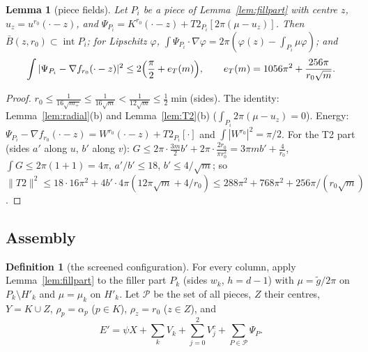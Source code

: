 \documentclass[11pt]{article}
\newtheorem{lemma}[theorem]{Lemma}
\theoremstyle{definition}
\newtheorem{definition}[theorem]{Definition}
\theoremstyle{remark}
\begin{document}
\begin{lemma}[piece fields]\label{lem:piece}
Let $P_i$ be a piece of Lemma~\ref{lem:fillpart} with centre $z$, $u_z=u^{r_0}(\cdot-z)$, and
$\Psi_{P_i}=K^{r_0}(\cdot-z)+T2_{P_i}[2\pi(\mu-u_z)]$. Then $\bar B(z,r_0)\subset\operatorname{int}P_i$; for Lipschitz $\varphi$,
$\int\Psi_{P_i}\cdot\nabla\varphi=2\pi(\varphi(z)-\int_{P_i}\mu\varphi)$; and
\[
\int|\Psi_{P_i}-\nabla f_{r_0}(\cdot-z)|^2\le2\Bigl(\frac\pi2+e_T(m)\Bigr),\qquad e_T(m)=1056\pi^2+\frac{256\pi}{r_0\sqrt m}.
\]
\end{lemma}
\begin{proof}
$r_0\le\frac1{16\sqrt{m_+}}\le\frac1{16\sqrt m}<\frac1{12\sqrt m}\le\frac12\min$(sides). The identity: Lemma~\ref{lem:radial}(b) and Lemma~\ref{lem:T2}(b)
($\int_{P_i}2\pi(\mu-u_z)=0$). Energy: $\Psi_{P_i}-\nabla f_{r_0}(\cdot-z)=W^{r_0}(\cdot-z)+T2_{P_i}[\cdot]$ and $\int|W^{r_0}|^2=\pi/2$. For the T2 part (sides $a'$ along
$u$, $b'$ along $v$): $G\le2\pi\cdot\frac{3m}2b'+2\pi\cdot\frac{2r_0}{\pi r_0^2}=3\pi mb'+\frac4{r_0}$, $\int G\le2\pi(1+1)=4\pi$, $a'/b'\le18$, $b'\le4/\sqrt m$; so
$\|T2\|^2\le18\cdot16\pi^2+4b'\cdot4\pi(12\pi\sqrt m+4/r_0)\le288\pi^2+768\pi^2+256\pi/(r_0\sqrt m)$.
\end{proof}

\subsection{Assembly}

\begin{definition}[the screened configuration]\label{def:assembly}
For every column, apply Lemma~\ref{lem:fillpart} to the filler part $P_k$ (sides $w_k$, $h=d-1$) with $\mu=\tilde g/2\pi$ on $P_k\setminus H'_k$ and
$\mu=\mu_k$ on $H'_k$. Let $\mathcal P$ be the set of all pieces, $Z$ their centres, $Y=K\cup Z$, $\rho_p=\alpha_p$ ($p\in K$), $\rho_z=r_0$ ($z\in Z$), and
\[
E'=\psi X+\sum_kV_k+\sum_{j=0}^2V^c_j+\sum_{P\in\mathcal P}\Psi_P .
\]
\end{definition}
\end{document}
